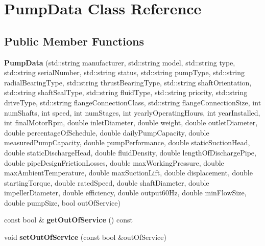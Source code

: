 \hypertarget{class_pump_data}{}\section{Pump\+Data Class Reference}
\label{class_pump_data}
\subsection*{Public Member Functions}
\begin{DoxyCompactItemize}
\item 
\mbox{\label{class_pump_data_abe0be07293009588aaca7f99170780dd}} 
{\bfseries Pump\+Data} (std\+::string manufacturer, std\+::string model, std\+::string type, std\+::string serial\+Number, std\+::string status, std\+::string pump\+Type, std\+::string radial\+Bearing\+Type, std\+::string thrust\+Bearing\+Type, std\+::string shaft\+Orientation, std\+::string shaft\+Seal\+Type, std\+::string fluid\+Type, std\+::string priority, std\+::string drive\+Type, std\+::string flange\+Connection\+Class, std\+::string flange\+Connection\+Size, int num\+Shafts, int speed, int num\+Stages, int yearly\+Operating\+Hours, int year\+Installed, int final\+Motor\+Rpm, double inlet\+Diameter, double weight, double outlet\+Diameter, double percentage\+Of\+Schedule, double daily\+Pump\+Capacity, double measured\+Pump\+Capacity, double pump\+Performance, double static\+Suction\+Head, double static\+Discharge\+Head, double fluid\+Density, double length\+Of\+Discharge\+Pipe, double pipe\+Design\+Friction\+Losses, double max\+Working\+Pressure, double max\+Ambient\+Temperature, double max\+Suction\+Lift, double displacement, double starting\+Torque, double rated\+Speed, double shaft\+Diameter, double impeller\+Diameter, double efficiency, double output60\+Hz, double min\+Flow\+Size, double pump\+Size, bool out\+Of\+Service)
\item 
\mbox{\label{class_pump_data_a08dc80a31806b6513c702ed6d67fbfdc}} 
const bool \& {\bfseries get\+Out\+Of\+Service} () const
\item 
\mbox{\label{class_pump_data_ab6c3468206a374bd28e11fbcc12fbfe5}} 
void {\bfseries set\+Out\+Of\+Service} (const bool \&out\+Of\+Service)
\item 
\mbox{\label{class_pump_data_aa529ba988168770099e88137e60e860f}} 

\end{DoxyCompactItemize}
